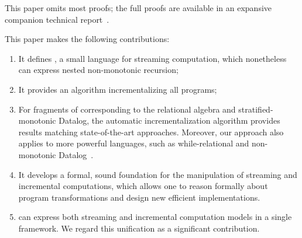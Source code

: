 \begin{comment}
    \item[abstract:] the two core concepts of
    (1) streaming computations, and (2) incremental computations
    are completely abstract, since they work over any algebraic group structure.
    By instantiating the group structure with the real numbers $\mathbb{R}$,
    we get traditional signal processing systems.  By substituting
    for the group structure \zrs we obtain streaming incremental computations over databases.
    \item[intuitive:] we often find that the connections of \dbsp to signal processing
    make it easier to understand.  It is easier to think about the theory as
    computing over real values, samples of a continuous signal.  Moreover, the two
    stream operators central to \dbsp, integration and differentiation,
    have very intuitive meanings in the world of signals.
    \item[visual:] In many circumstances stream circuit diagrams
    are easier to read and comprehend than the corresponding mathematical formulas.
    \item[economic:] the simple streaming model is built essentially from
    two elementary mathematical operators: lifting $\lift$ and delay $\zm$.  The nested
    streams model adds two additional operators, $\delta_0$ for stream construction and
    $\int$ for destruction.
\end{comment}

This paper omits most proofs; the full proofs are available in an expansive
companion technical report~\cite{tr}.

This paper makes the following contributions:
\begin{enumerate}[nosep, leftmargin=0pt, itemindent=0.5cm, label=\textbf{(\arabic{*})}]
    \item It defines \dbsp, a small language for streaming computation, which
    nonetheless can express nested non-monotonic recursion;
    \item It provides an algorithm incrementalizing all \dbsp programs;
    \item For fragments of \dbsp corresponding to the relational algebra and stratified-monotonic
    Datalog,
    the automatic incrementalization algorithm provides results matching state-of-the-art approaches.
    Moreover, our approach also applies to more powerful languages, such as while-relational and non-monotonic
    Datalog~\cite{Abiteboul-book95}.
    \item It develops a formal, sound foundation for the manipulation of streaming and incremental computations,
    which allows one to reason formally about program transformations and design new efficient implementations.
    \item \dbsp can express both streaming and incremental computation models in a single framework.  We regard this unification as a significant contribution.
\end{enumerate}

